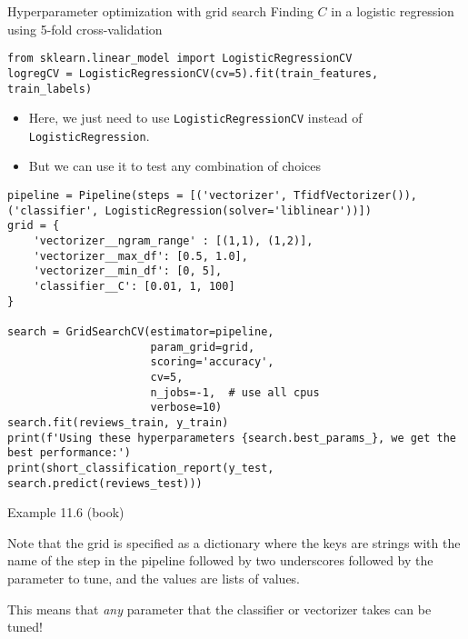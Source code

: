 \begin{frame}[fragile]{Hyperparameter optimization with grid search}
Finding $C$ in a logistic regression using 5-fold cross-validation
\begin{lstlisting}
from sklearn.linear_model import LogisticRegressionCV
logregCV = LogisticRegressionCV(cv=5).fit(train_features, train_labels)
\end{lstlisting}
\pause 

\begin{itemize}[<+->]
\item Here, we just need to use \texttt{LogisticRegressionCV} instead of \texttt{LogisticRegression}. 
\item But we can use it to test any combination of choices
\end{itemize}
\end{frame}




\begin{frame}
	\small
\begin{verbatim}
pipeline = Pipeline(steps = [('vectorizer', TfidfVectorizer()), ('classifier', LogisticRegression(solver='liblinear'))])
grid = {
    'vectorizer__ngram_range' : [(1,1), (1,2)],
    'vectorizer__max_df': [0.5, 1.0],
    'vectorizer__min_df': [0, 5],
    'classifier__C': [0.01, 1, 100]
}

search = GridSearchCV(estimator=pipeline,
                      param_grid=grid,
                      scoring='accuracy', 
                      cv=5,
                      n_jobs=-1,  # use all cpus
                      verbose=10)
search.fit(reviews_train, y_train)
print(f'Using these hyperparameters {search.best_params_}, we get the best performance:')
print(short_classification_report(y_test, search.predict(reviews_test)))
\end{verbatim}
Example 11.6 (book)
\end{frame}

\begin{frame}[standout]
Note that the grid is specified as a dictionary where the keys are strings with the name of the step in the pipeline followed by two underscores followed by the parameter to tune, and the values are lists of values.

This means that \emph{any} parameter that the classifier or vectorizer takes can be tuned!
\end{frame}



